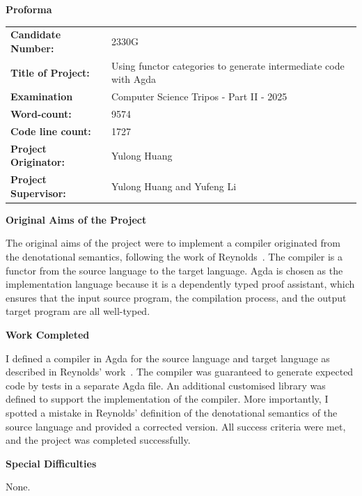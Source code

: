 \documentclass[12pt,a4paper]{report}
\theoremstyle{definition}
\begin{document}
\begin{titlepage}
    \vspace*{5em}
    \textbf{\LARGE Proforma}
    \vspace{2em}

    \begin{tabular}{ll}
        \textbf{Candidate Number:} & 2330G \\
        \textbf{Title of Project:} & Using functor categories to generate intermediate code with Agda \\
        \textbf{Examination} & Computer Science Tripos - Part II - 2025 \\
        \textbf{Word-count:} & 9574 \footnotemark \\
        \textbf{Code line count:} & 1727 \footnotemark \\
        \textbf{Project Originator:} & Yulong Huang \\
        \textbf{Project Supervisor:} & Yulong Huang and Yufeng Li \\
    \end{tabular}

    \vspace{2em}
    \textbf{\Large Original Aims of the Project}
    \vspace{1em}

    The original aims of the project were to implement a compiler originated from the denotational semantics, following the work of Reynolds~\autocite{Reynolds}. The compiler is a functor from the source language to the target language. Agda is chosen as the implementation language because it is a dependently typed proof assistant, which ensures that the input source program, the compilation process, and the output target program are all well-typed.

    \vspace{2em}
    \textbf{\Large Work Completed}
    \vspace{1em}

    I defined a compiler in Agda for the source language and target language as described in Reynolds' work~\autocite{Reynolds}. The compiler was guaranteed to generate expected code by tests in a separate Agda file. An additional customised library was defined to support the implementation of the compiler. More importantly, I spotted a mistake in Reynolds' definition of the denotational semantics of the source language and provided a corrected version. All success criteria were met, and the project was completed successfully.

    \vspace{2em}
    \textbf{\Large Special Difficulties}
    \vspace{1em}
    
    None.


    \begingroup
    \endgroup
\end{titlepage}
\end{document}
